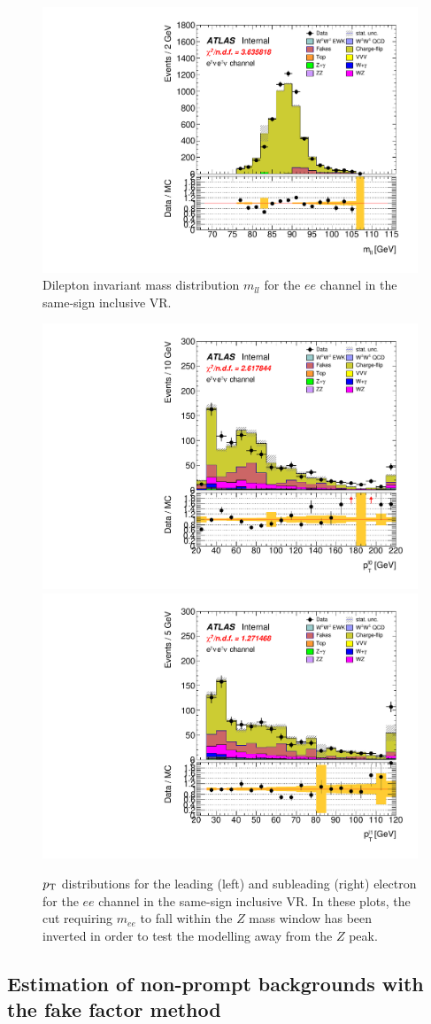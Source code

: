 \begin{figure}
  \centering
  \includegraphics[width=.48\textwidth]{figs/ssww_13tev/backgrounds/charge_flip/ee-CutCRInclusiveSSZ-Mll_Zpeak-lin}
  \caption{Dilepton invariant mass distribution $m_{ll}$ for the $ee$ channel in the same-sign inclusive VR.}
  \label{fig:ssww13tev_ssincl_mll}
\end{figure}

\begin{figure}
  \centering
  \includegraphics[width=.48\textwidth]{figs/ssww_13tev/backgrounds/charge_flip/ee-CutCRInclusiveSSZVeto-l0_pt-lin.pdf}
  \includegraphics[width=.48\textwidth]{figs/ssww_13tev/backgrounds/charge_flip/ee-CutCRInclusiveSSZVeto-l1_pt-lin.pdf}
  \caption{$p_{\mathrm{T}}$ distributions for the leading (left) and subleading (right) electron for the $ee$ channel in the same-sign inclusive VR.  In these plots, the cut requiring $m_{ee}$ to fall within the $Z$ mass window has been inverted in order to test the modelling away from the $Z$ peak.}
  \label{fig:ssww13tev_ssincl_ptlep}
\end{figure}

\subsection{Estimation of non-prompt backgrounds with the fake factor method}\label{ssww13tev:fake_factor}

